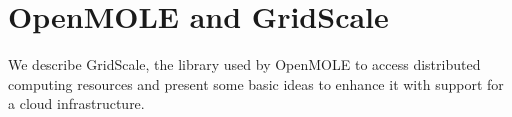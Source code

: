 \chapter{OpenMOLE and GridScale}

We describe GridScale, the library used by OpenMOLE to access distributed computing resources and present some basic ideas to enhance it with support for a cloud infrastructure.